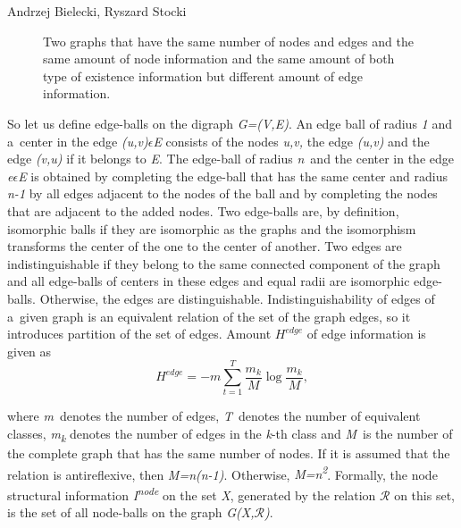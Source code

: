 \begin{artengenv2auth}{Andrzej Bielecki, Ryszard Stocki}
\begin{figure}[htbp]
 \caption{Two graphs that have the same number of nodes and edges and the same amount of node information and the same amount of both type of existence information but different amount of edge information.}
 \label{bie:fig2}
\end{figure}






So let us define edge-balls on the digraph \textit{G=(V,E)}. An edge ball of radius \textit{1} and a~center in the edge \textit{(u,v)$\epsilon $E} consists of the nodes \textit{u,v,} the edge \textit{(u,v)} and the edge \textit{(v,u)} if it belongs to \textit{E}. The edge-ball of radius \textit{n}~and the center in the edge \textit{e$\epsilon $E} is obtained by completing the edge-ball that has the same center and radius \textit{n-1} by all edges adjacent to the nodes of the ball and by completing the nodes that are adjacent to the added nodes. Two edge-balls are, by definition, isomorphic balls if they are isomorphic as the graphs and the isomorphism transforms the center of the one to the center of another. Two edges are indistinguishable if they belong to the same connected component of the graph and all edge-balls of centers in these edges and equal radii are isomorphic edge-balls. Otherwise, the edges are distinguishable. Indistinguishability of edges of a~given graph is an equivalent relation of the set of the graph edges, so it introduces partition of the set of edges. Amount $H^{\textit{edge}}$ of edge information is given as
\begingroup
\reqnos
\begin{equation}
H^{\textit{edge}}=-m\sum _{t=1}^T\frac{m_k} M\log \frac{m_k} M,
\end{equation}
\endgroup




where \textit{m}~denotes the number of edges, \textit{T}~denotes the number of equivalent classes, \textit{m}\textit{\textsubscript{k}} denotes the number of edges in the \textit{k}{}-th class and \textit{M}~is the number of the complete graph that has the same number of nodes. If it is assumed that the relation is antireflexive, then \textit{M=n(n-1)}. Otherwise, \textit{M=n}\textit{\textsuperscript{2}}.  Formally, the node structural information \textit{I}\textit{\textsuperscript{node}} on the set \textit{X}, generated by the relation $\mathcal{R}$ on this set, is the set of all node-balls on the graph \textit{G(X,$\mathcal{R}$)}.




\end{artengenv2auth}
